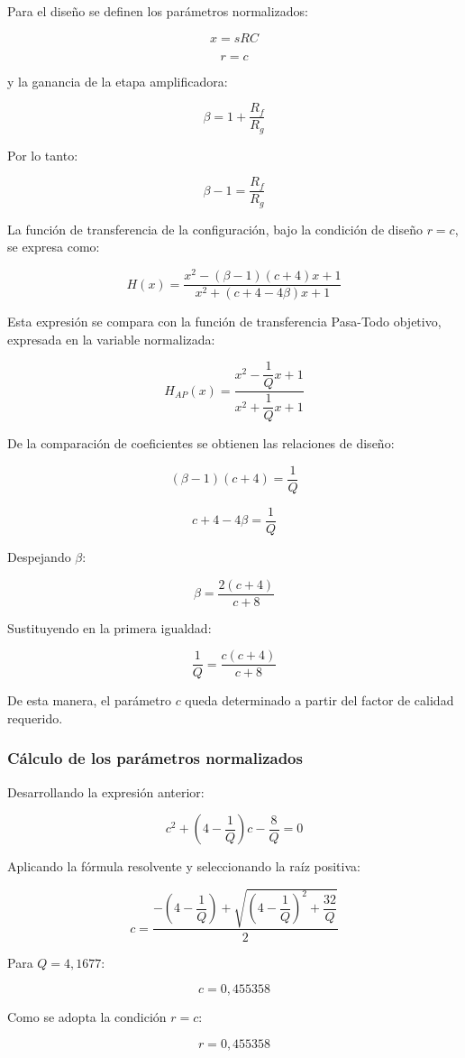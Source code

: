 \documentclass[12pt]{article}
\begin{document}
\begin{itemize}
Para el diseño se definen los parámetros normalizados:

\[
x=sRC
\]

\[
r=c
\]

y la ganancia de la etapa amplificadora:

\[
\beta=1+\frac{R_f}{R_g}
\]

Por lo tanto:

\[
\beta-1=\frac{R_f}{R_g}
\]

La función de transferencia de la configuración, bajo la condición de diseño \(r=c\), se expresa como:

\[
H(x)=
\frac{x^2-(\beta-1)(c+4)x+1}
{x^2+(c+4-4\beta)x+1}
\]

Esta expresión se compara con la función de transferencia Pasa-Todo objetivo, expresada en la variable normalizada:

\[
H_{AP}(x)=
\frac{x^2-\dfrac{1}{Q}x+1}
{x^2+\dfrac{1}{Q}x+1}
\]

De la comparación de coeficientes se obtienen las relaciones de diseño:

\[
(\beta-1)(c+4)=\frac{1}{Q}
\]

\[
c+4-4\beta=\frac{1}{Q}
\]

Despejando \(\beta\):

\[
\boxed{\beta=\frac{2(c+4)}{c+8}}
\]

Sustituyendo en la primera igualdad:

\[
\boxed{\frac{1}{Q}=\frac{c(c+4)}{c+8}}
\]

De esta manera, el parámetro \(c\) queda determinado a partir del factor de calidad requerido.

\subsubsection{Cálculo de los parámetros normalizados}

Desarrollando la expresión anterior:

\[
c^2+\left(4-\frac{1}{Q}\right)c-\frac{8}{Q}=0
\]

Aplicando la fórmula resolvente y seleccionando la raíz positiva:

\[
c=
\frac{
-\left(4-\dfrac{1}{Q}\right)+
\sqrt{\left(4-\dfrac{1}{Q}\right)^2+\dfrac{32}{Q}}
}{2}
\]

Para \(Q=4,1677\):

\[
\boxed{c=0,455358}
\]

Como se adopta la condición \(r=c\):

\[
\boxed{r=0,455358}
\]


\end{itemize}
\end{document}
